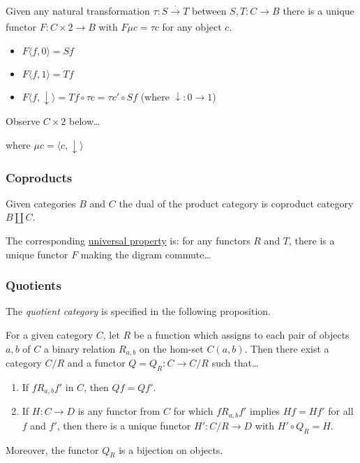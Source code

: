 \label{universalnaturaltransformation}

Given any natural transformation $\tau: S \xrightarrow[]{\cdot} T$ between $S,T: C \rightarrow B$ there is a unique functor $F: C \times 2 \rightarrow B$ with $F \mu c = \tau c$ for any object $c$.
\begin{itemize}
  \item $F\langle f,0 \rangle = Sf$
  \item $F\langle f,1 \rangle = Tf$
  \item $F\langle f, \downarrow \rangle = Tf \circ \tau c = \tau c' \circ Sf$ (where $\downarrow : 0 \rightarrow 1$)
\end{itemize}

\noindent Observe $C \times 2$ below\dots

\begin{figure}[H]
\centering

\end{figure}

\noindent where $\mu c = \langle c, \downarrow \rangle$

\subsubsection{Coproducts}\label{coproducts}

Given categories $B$ and $C$ the dual of the product category is coproduct category $B \coprod C$.\newline

\noindent The corresponding \hyperref[universality]{universal property} is: for any functors $R$ and $T$, there is a unique functor $F$ making the digram commute\dots
\begin{figure}[H]
\centering

\end{figure}

\subsubsection{Quotients}\label{quotients}

The \emph{quotient category} is specified in the following proposition.

\begin{proposition}
For a given category $C$, let $R$ be a function which assigns to each pair of objects $a,b$ of $C$ a binary relation $R_{a,b}$ on the hom-set $C(a,b)$.
Then there exist a category $C/R$ and a functor $Q = Q_R:C \rightarrow C/R$ such that\dots
\begin{enumerate}
  \item If $fR_{a,b}f'$ in $C$, then $Qf = Qf'$.
  \item If $H:C \rightarrow D$ is any functor from $C$ for which $f R_{a,b} f'$ implies $Hf = Hf'$ for all $f$ and $f'$, then there is a unique functor $H':C/R \rightarrow D$
  with $H' \circ Q_R = H$.
\end{enumerate}
Moreover, the functor $Q_R$ is a bijection on objects.
\end{proposition}

